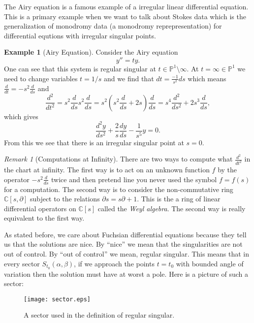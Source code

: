 \documentclass[12pt]{book}
\numberwithin{equation}{section}
\theoremstyle{definition}
\newtheorem{example}[theorem]{Example}
\theoremstyle{remark}
\newtheorem{remark}[theorem]{Remark}
\newcommand{\CC}{\mathbb{C}}
\newcommand{\PP}{\mathbb{P}}
\begin{document}
The Airy equation is a famous example of a irregular linear differential equation.
This is a primary example when we want to talk about Stokes data which is the generalization of monodromy data (a monodromy reprepresentation) for differential equtions with irregular singular points.
\begin{example}[Airy Equation]
	Consider the Airy equation 
	 $$ y'' = ty.$$
	One can see that this system is regular singular at $t \in \PP^1\setminus \infty$.  
	At $t=\infty \in \PP^1$ we need to change variables $t=1/s$ and we find that $dt = \frac{-1}{s^2}ds$ which means $\frac{d}{dt} = -s^2 \frac{d}{ds}$ and $$\frac{d^2}{dt^2} = s^2 \frac{d}{ds} s^2 \frac{d}{ds}= s^2 (s^2\frac{d}{ds} + 2s)\frac{d}{ds} = s^4\frac{d^2}{ds^2}+2s^3 \frac{d}{ds},$$
	which gives 
	 $$ \frac{d^2y}{ds^2}+ \frac{2}{s} \frac{dy}{ds} - \frac{1}{s^5} y=0. $$
	From this we see that there is an irregular singular point at $s=0$.
\end{example}

\begin{remark}[Computations at Infinity]
	There are two ways to compute what $\frac{d^2}{dt^2}$ in the chart at infinity. 
	The first way is to act on an unknown function $f$ by the operator $-s^2 \frac{d}{ds}$ twice and then pretend line you never used the symbol $f=f(s)$ for a computation.
	The second way is to consider the non-commutative ring $\CC[s,\partial]$ subject to the relations $\partial s = s\partial + 1$. 
	This is the a ring of linear differential operators on $\CC[s]$ called the \emph{Weyl algebra}.
	The second way is really equivalent to the first way.
\end{remark}

As stated before, we care about Fuchsian differential equations because they tell us that the solutions are nice. 
By ``nice'' we mean that the singularities are not out of control.
By ``out of control'' we mean, regular singular. 
This means that in every sector $S_{t_0}(\alpha,\beta)$, if we approach the points $t=t_0$ with bounded angle of variation then the solution must have at worst a pole.
Here is a picture of such a sector:

\begin{figure}[h]
	\begin{center}
	\texttt{[image: sector.eps]}
	\end{center}
	\caption{A sector used in the definition of regular singular. }
\end{figure}
\end{document}

